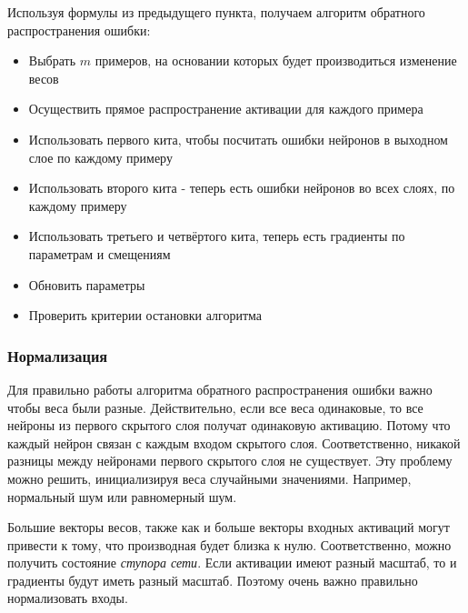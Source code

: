 Используя формулы из предыдущего пункта, получаем алгоритм обратного распространения ошибки:

\begin{itemize}
  \item Выбрать $m$ примеров, на основании которых будет производиться изменение весов
  \item Осуществить прямое распространение активации для каждого примера
  \item Использовать первого кита, чтобы посчитать ошибки нейронов в выходном слое по каждому примеру
  \item Использовать второго кита - теперь есть ошибки нейронов во всех слоях, по каждому примеру
  \item Использовать третьего и четвёртого кита, теперь есть градиенты по параметрам и смещениям
  \item Обновить параметры
  \item Проверить критерии остановки алгоритма
\end{itemize}

\subsubsection{Нормализация}

Для правильно работы алгоритма обратного распространения ошибки важно чтобы веса были разные. Действительно, если все веса одинаковые, то все нейроны из первого скрытого слоя получат одинаковую активацию. Потому что каждый нейрон связан с каждым входом скрытого слоя. Соответственно, никакой разницы между нейронами первого скрытого слоя не существует. 
Эту проблему можно решить, инициализируя веса случайными значениями. Например, нормальный шум или равномерный шум.

Большие векторы весов, также как и больше векторы входных активаций могут привести к тому, что производная будет близка к нулю. Соответственно, можно получить состояние \textit{ступора сети}. Если активации имеют разный масштаб, то и градиенты будут иметь разный масштаб. Поэтому очень важно правильно нормализовать входы.